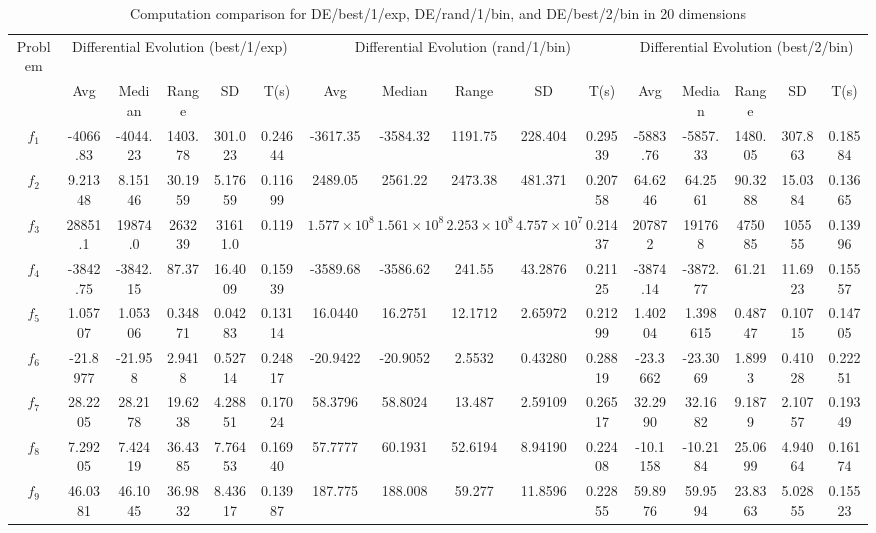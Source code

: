 \documentclass[paper=a4, fontsize=11pt]{scrartcl} %
\numberwithin{equation}{section} %
\numberwithin{figure}{section} %
\numberwithin{table}{section} %
\begin{document}
\begin{landscape}
	\begin{table}
		\tiny
		\centering
		\caption{Computation comparison for DE/best/1/exp, DE/rand/1/bin, and DE/best/2/bin in 20 dimensions}
		\label{Tab1d}
		\begin{tabular}{c|ccccc|ccccc|ccccc}
			\noalign{\smallskip}\hline\noalign{\smallskip}
			Problem & \multicolumn{5}{c}{Differential Evolution (best/1/exp)}& \multicolumn{5}{|c|}{Differential Evolution (rand/1/bin)} &  \multicolumn{5}{c}{Differential Evolution (best/2/bin)} \\  
			\noalign{\smallskip}\hline\noalign{\smallskip}
			& Avg & Median & Range & SD & T(s) & Avg & Median
			& Range & SD & T(s) & Avg & Median & Range & SD &
			T(s) \\ 
			\noalign{\smallskip}\hline\noalign{\smallskip}
			$f_{1}$  & -4066.83 & -4044.23 & 1403.78 & 301.023 & 0.24644 & -3617.35 & -3584.32 & 1191.75 & 228.404 & 0.29539 & -5883.76 & -5857.33 & 1480.05 & 307.863 & 0.18584\\
			$f_{2}$  &  9.21348 &  8.15146 & 30.1959 & 5.17659 & 0.11699 &  2489.05 &  2561.22 & 2473.38 & 481.371 & 0.20758 &  64.6246 &  64.2561 & 90.3288 & 15.0384 & 0.13665\\
			$f_{3}$  &  28851.1 &  19874.0 & 263239  & 31611.0 & 0.119   &  $1.577\times 10^{8}$ & $1.561\times 10^{8}$ & $2.253\times 10^{8}$ & $4.757\times 10^{7}$ & 0.21437 & 207872 & 191768 & 475085 & 105555 & 0.13996\\
			$f_{4}$  & -3842.75 & -3842.15 & 87.37   & 16.4009 & 0.15939 & -3589.68 & -3586.62 & 241.55  & 43.2876 & 0.21125 & -3874.14 & -3872.77 & 61.21   & 11.6923 & 0.15557\\
			$f_{5}$  &  1.05707 &  1.05306 & 0.34871 & 0.04283 & 0.13114 &  16.0440 &  16.2751 & 12.1712 & 2.65972 & 0.21299 &  1.40204 & 1.398615 & 0.48747 & 0.10715 & 0.14705\\
			$f_{6}$  & -21.8977 & -21.958  & 2.9418  & 0.52714 & 0.24817 & -20.9422 & -20.9052 & 2.5532  & 0.43280 & 0.28819 & -23.3662 & -23.3069 & 1.8993  & 0.41028 & 0.22251\\
			$f_{7}$  &  28.2205 &  28.2178 & 19.6238 & 4.28851 & 0.17024 &  58.3796 &  58.8024 & 13.487  & 2.59109 & 0.26517 &  32.2990 &  32.1682 & 9.1879  & 2.10757 & 0.19349\\
			$f_{8}$  &  7.29205 &  7.42419 & 36.4385 & 7.76453 & 0.16940 &  57.7777 &  60.1931 & 52.6194 & 8.94190 & 0.22408 & -10.1158 & -10.2184 & 25.0699 & 4.94064 & 0.16174\\
			$f_{9}$  &  46.0381 &  46.1045 & 36.9832 & 8.43617 & 0.13987 &  187.775 &  188.008 & 59.277  & 11.8596 & 0.22855 &  59.8976 &  59.9594 & 23.8363 & 5.02855 & 0.15523\\

\end{tabular}
\end{table}
\end{landscape}
\end{document}
